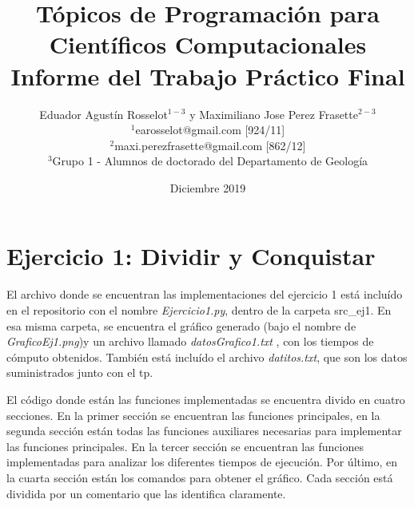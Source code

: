 \documentclass[12pt,a4paper]{article}
\begin{document}
\title{%
	Tópicos de Programación para Científicos Computacionales\\
	\large Informe del Trabajo Práctico Final}
	
\author {Eduador Agustín Rosselot$^{1-3}$ y Maximiliano Jose Perez Frasette$^{2-3}$\\ 
	\small{$^{1}$earosselot@gmail.com [924/11]}\\
	\small{$^{2}$maxi.perezfrasette@gmail.com [862/12]}\\
	\small{$^{3}$Grupo 1 - Alumnos de doctorado del Departamento de Geología}\\
	}
\date{Diciembre 2019}

\maketitle


\section{Ejercicio 1: Dividir y Conquistar}

El archivo donde se encuentran las implementaciones del ejercicio 1 está incluído en el repositorio con el nombre \textit{Ejercicio1.py}, dentro de la carpeta src\_ej1. En esa misma carpeta, se encuentra el gráfico generado (bajo el nombre de \textit{GraficoEj1.png})y un archivo llamado \textit{datosGrafico1.txt} , con los tiempos de cómputo obtenidos. También está incluído el archivo \textit{datitos.txt}, que son los datos suministrados junto con el tp.\par

El código donde están las funciones implementadas se encuentra divido en cuatro secciones. En la primer sección se encuentran las funciones principales, en la segunda sección están todas las funciones auxiliares necesarias para implementar las funciones principales. En la tercer sección se encuentran las funciones implementadas para analizar los diferentes tiempos de ejecución. Por último, en la cuarta sección están los comandos para obtener el gráfico. Cada sección está dividida por un comentario que las identifica claramente. \par
\end{document}
